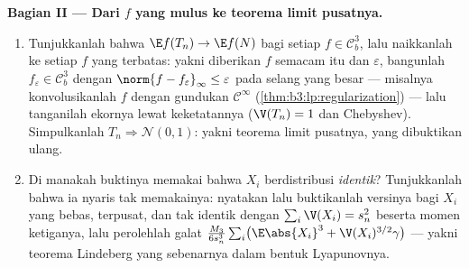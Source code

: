 \begin{problem}
\medskip
\noindent\textbf{Bagian II --- Dari $f$ yang mulus ke teorema limit pusatnya.}
\begin{enumerate}[resume]
  \item Tunjukkanlah bahwa $\E f(T_n) \to \E f(N)$ bagi setiap $f \in
        \mathcal C_b^3$, lalu naikkanlah ke setiap $f$ yang 
        terbatas: yakni diberikan $f$ semacam itu dan $\varepsilon$,
        bangunlah $f_\varepsilon \in \mathcal C^3_b$ dengan
        $\norm{f - f_\varepsilon}_\infty \leq \varepsilon$
        pada selang yang besar --- misalnya konvolusikanlah $f$ dengan
        gundukan $\mathcal C^\infty$
        (\cref{thm:b3:lp:regularization}) --- lalu tanganilah
        ekornya lewat keketatannya ($\V(T_n) = 1$ dan Chebyshev).
        Simpulkanlah $T_n \Rightarrow \mathcal N(0, 1)$: yakni
        teorema limit pusatnya, yang dibuktikan ulang.
  \item Di manakah buktinya memakai bahwa $X_i$ berdistribusi
        \emph{identik}? Tunjukkanlah bahwa ia nyaris tak
        memakainya: nyatakan lalu buktikanlah versinya bagi $X_i$ yang
        bebas, terpusat, dan tak identik dengan
        $\sum_i\V(X_i) = s_n^2$ beserta momen ketiganya, lalu perolehlah
        galat $\frac{M_3}{6s_n^3}\sum_i\bigl(\E\abs{X_i}^3
        + \V(X_i)^{3/2}\gamma\bigr)$ --- yakni teorema Lindeberg
        yang sebenarnya dalam bentuk Lyapunovnya.
\end{enumerate}


\end{problem}
